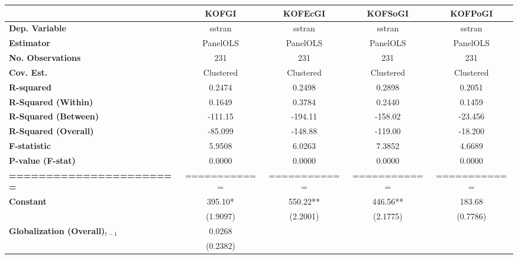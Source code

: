 \begin{center}
\begin{tabular}{lcccc}
\toprule
                                   & \textbf{KOFGI} & \textbf{KOFEcGI} & \textbf{KOFSoGI} & \textbf{KOFPoGI}  \\
\midrule
\textbf{Dep. Variable}             &     sstran     &      sstran      &      sstran      &      sstran       \\
\textbf{Estimator}                 &    PanelOLS    &     PanelOLS     &     PanelOLS     &     PanelOLS      \\
\textbf{No. Observations}          &      231       &       231        &       231        &       231         \\
\textbf{Cov. Est.}                 &   Clustered    &    Clustered     &    Clustered     &    Clustered      \\
\textbf{R-squared}                 &     0.2474     &      0.2498      &      0.2898      &      0.2051       \\
\textbf{R-Squared (Within)}        &     0.1649     &      0.3784      &      0.2440      &      0.1459       \\
\textbf{R-Squared (Between)}       &    -111.15     &     -194.11      &     -158.02      &     -23.456       \\
\textbf{R-Squared (Overall)}       &    -85.099     &     -148.88      &     -119.00      &     -18.200       \\
\textbf{F-statistic}               &     5.9508     &      6.0263      &      7.3852      &      4.6689       \\
\textbf{P-value (F-stat)}          &     0.0000     &      0.0000      &      0.0000      &      0.0000       \\
\textbf{=======================}   &  ============  &   ============   &   ============   &   ============    \\
\textbf{Constant}                     &    395.10*     &     550.22**     &     446.56**     &      183.68       \\
\textbf{ }                         &    (1.9097)    &     (2.2001)     &     (2.1775)     &     (0.7786)      \\
\textbf{Globalization (Overall)$_{t-1}$}               &     0.0268     &                  &                  &                   \\
\textbf{ }                         &    (0.2382)    &                  &                  &                   \\

\end{tabular}
\end{center}
